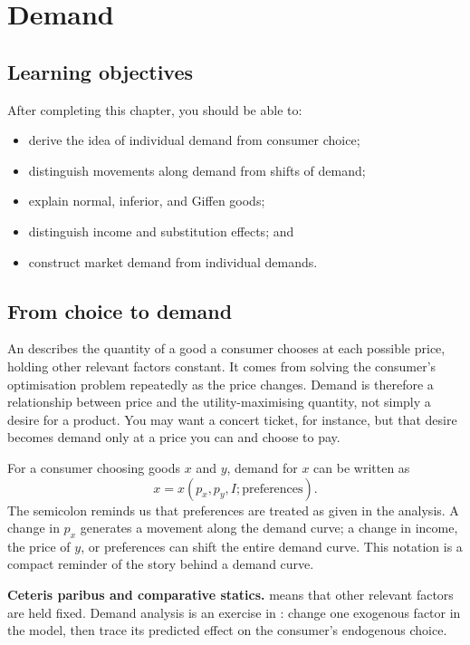 \chapter{Demand}
\label{chap:demand}

\section{Learning objectives}

After completing this chapter, you should be able to:
\begin{itemize}
  \item derive the idea of individual demand from consumer choice;
  \item distinguish movements along demand from shifts of demand;
  \item explain normal, inferior, and Giffen goods;
  \item distinguish income and substitution effects; and
  \item construct market demand from individual demands.
\end{itemize}

\section{From choice to demand}

An  describes the quantity of a good a
consumer chooses at each possible price, holding other relevant factors
constant. It comes from solving the consumer's optimisation problem repeatedly
as the price changes. Demand is therefore a relationship between price and
the utility-maximising quantity, not simply a desire for a product. You may
want a concert ticket, for instance, but that desire becomes demand only at a
price you can and choose to pay.

For a consumer choosing goods $x$ and $y$, demand for $x$ can be written as
\[
x=x(p_x,p_y,I;\text{preferences}).
\]
The semicolon reminds us that preferences are treated as given in the
analysis. A change in $p_x$ generates a movement along the demand curve; a
change in income, the price of $y$, or preferences can shift the entire demand
curve. This notation is a compact reminder of the story behind a demand
curve.

\begin{keyidea}
\textbf{Ceteris paribus and comparative statics.}
 means that other relevant factors are held fixed.
Demand analysis is an exercise in : change one
exogenous factor in the model, then trace its predicted effect on the
consumer's endogenous choice.
\end{keyidea}

